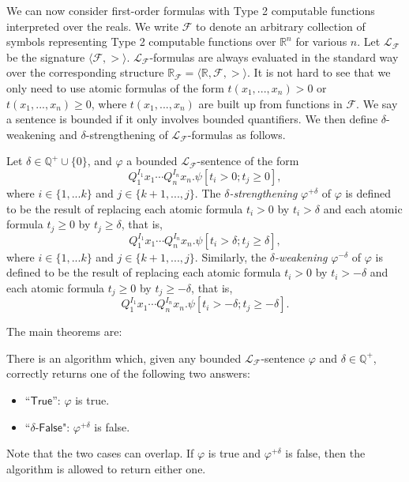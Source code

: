 \documentclass{llncs}
\begin{document}
We can now consider first-order formulas with Type 2 computable functions interpreted over the reals. We write $\mathcal{F}$ to denote an arbitrary collection of symbols representing Type 2 computable functions over $\mathbb{R}^n$ for various $n$. Let $\mathcal{L_{\mathcal{F}}}$ be the signature $\langle \mathcal{F}, >\rangle$. $\mathcal{L}_{\mathcal{F}}$-formulas are always evaluated in the standard way over the corresponding structure $\mathbb{R}_{\mathcal{F}}= \langle \mathbb{R}, \mathcal{F}, >\rangle$. It is not hard to see that we only need to use atomic formulas of the form $t(x_1,...,x_n)>0$ or $t(x_1,...,x_n)\geq 0$, where $t(x_1,...,x_n)$ are built up from functions in $\mathcal{F}$. We say a sentence is bounded if it only involves bounded quantifiers. We then define $\delta$-weakening and $\delta$-strengthening of $\mathcal{L}_{\mathcal{F}}$-formulas as follows. 
\begin{definition}
Let $\delta\in \mathbb{Q}^+\cup\{0\}$, and $\varphi$ a bounded $\mathcal{L}_{\mathcal{F}}$-sentence of the form
$$Q_1^{I_1}x_1\cdots Q_n^{I_n}x_n.\psi[t_i>0; t_j\geq 0],$$
where $i\in\{1,...k\}$ and $j\in\{k+1,...,j\}$. The {\em $\delta$-strengthening} $\varphi^{+\delta}$ of $\varphi$ is defined to be the result of replacing each atomic formula $t_i > 0$ by $t_i > \delta$ and each atomic formula $t_j \geq 0$ by $t_j \geq \delta$, that is,
$$Q_1^{I_1}x_1\cdots Q_n^{I_n}x_n.\psi[t_i>\delta; t_j\geq \delta],$$
where $i\in\{1,...k\}$ and $j\in\{k+1,...,j\}$.
Similarly, the {\em $\delta$-weakening} $\varphi^{-\delta}$ of $\varphi$ is defined to be the result of replacing each atomic formula $t_i > 0$ by $t_i > -\delta$ and each atomic formula $t_j \geq 0$ by $t_j \geq -\delta$, that is,
$$Q_1^{I_1}x_1\cdots Q_n^{I_n}x_n.\psi[t_i>-\delta; t_j\geq -\delta].$$
\end{definition}
The main theorems are:
\begin{theorem}\label{main}
There is an algorithm which, given any bounded $\mathcal{L}_{\mathcal{F}}$-sentence $\varphi$ and $\delta\in \mathbb{Q}^+$, correctly returns one of the following two answers:
\begin{itemize}
\item ``$\mathsf{True}$'': $\varphi$ is true. 
\item ``$\delta$-$\mathsf{False}$": $\varphi^{+\delta}$ is false. 
\end{itemize}
\end{theorem}

Note that the two cases can overlap. If $\varphi$ is true and $\varphi^{+\delta}$ is false, then the algorithm is allowed to return either one. 
\end{document}
